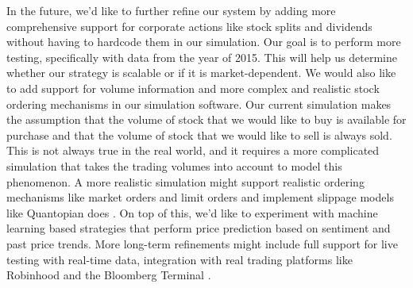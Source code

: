 In the future, we'd like to further refine our system by adding more comprehensive support for corporate actions like stock splits and dividends without having to hardcode them in our simulation. Our goal is to perform more testing, specifically with data from the year of 2015. This will help us determine whether our strategy is scalable or if it is market-dependent. We would also like to add support for volume information and more complex and realistic stock ordering mechanisms in our simulation software. Our current simulation makes the assumption that the volume of stock that we would like to buy is available for purchase and that the volume of stock that we would like to sell is always sold. This is not always true in the real world, and it requires a more complicated simulation that takes the trading volumes into account to model this phenomenon. A more realistic simulation might support realistic ordering mechanisms like market orders and limit orders and implement slippage models like Quantopian does \cite{quantopianSlippage}. On top of this, we'd like to experiment with machine learning based strategies that perform price prediction based on sentiment and past price trends. More long-term refinements might include full support for live testing with real-time data, integration with real trading platforms like Robinhood \cite{robinhood} and the Bloomberg Terminal \cite{terminal}. 

